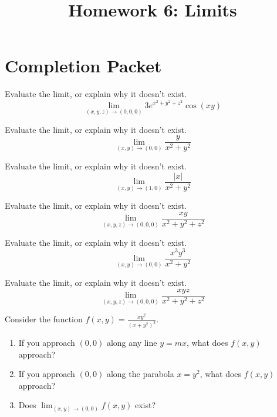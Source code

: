 \documentclass{ximera}
\title{Homework 6: Limits}
\begin{document}
\begin{abstract}
\end{abstract}
\maketitle

\section*{Completion Packet}

\begin{problem}
Evaluate the limit, or explain why it doesn't exist.
\[
\lim_{(x,y,z)\rightarrow (0,0,0)} 3e^{x^2+y^2+z^2}\cos(xy)
\]
\end{problem}

\begin{problem}
Evaluate the limit, or explain why it doesn't exist.
\[
\lim_{(x,y)\rightarrow (0,0)}\dfrac{y}{x^2+y^2}
\]
\end{problem}

\begin{problem}
Evaluate the limit, or explain why it doesn't exist.
\[
\lim_{(x,y)\rightarrow (1,0)}\dfrac{|x|}{x^2+y^2}
\]
\end{problem}

\begin{problem}
Evaluate the limit, or explain why it doesn't exist.
\[
\lim_{(x,y,z) \rightarrow (0,0,0)}\dfrac{xy}{x^2+y^2+z^2}
\]
\end{problem}

\begin{problem}
Evaluate the limit, or explain why it doesn't exist.
\[
\lim_{(x,y)\rightarrow (0,0)}\dfrac{x^3y^3}{x^2+y^2}
\]
\end{problem}

\begin{problem}
Evaluate the limit, or explain why it doesn't exist.
\[
\lim_{(x,y,z) \rightarrow (0,0,0)}\dfrac{xyz}{x^2+y^2+z^2}
\]
\end{problem}

\begin{problem}
Consider the function $f(x,y) = \frac{xy^2}{(x+y^2)^2}$.
\begin{enumerate}
\item If you approach $(0,0)$ along any line $y=mx$, what does $f(x,y)$ approach?
\item If you approach $(0,0)$ along the parabola $x=y^2$, what does $f(x,y)$ approach?
\item Does $\lim_{(x,y)\rightarrow (0,0)} f(x,y)$ exist?
\end{enumerate}
\end{problem}
\end{document}
